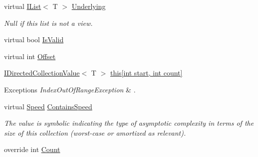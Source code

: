 \begin{DoxyCompactItemize}
\item 
virtual \hyperlink{interface_c5_1_1_i_list}{I\+List}$<$ T $>$ \hyperlink{class_c5_1_1_hashed_linked_list_ab70556e117c40bfeea64e24daa937955}{Underlying}
\begin{DoxyCompactList}\small\item\em Null if this list is not a view. \end{DoxyCompactList}\item 
virtual bool \hyperlink{class_c5_1_1_hashed_linked_list_a548a9179889fa5600ad6cea96b341893}{Is\+Valid}
\item 
virtual int \hyperlink{class_c5_1_1_hashed_linked_list_aae6da46ea57defcd779416e00622adbb}{Offset}
\item 
\hyperlink{interface_c5_1_1_i_directed_collection_value}{I\+Directed\+Collection\+Value}$<$ T $>$ \hyperlink{class_c5_1_1_hashed_linked_list_aaf5b40fcd1eaa99ad9d4a0127f286e3f}{this\mbox{[}int start, int count\mbox{]}}
\begin{DoxyCompactList}\small\item\em 
\begin{DoxyExceptions}{Exceptions}
{\em Index\+Out\+Of\+Range\+Exception} & . \\
\hline
\end{DoxyExceptions}
\end{DoxyCompactList}\item 
virtual \hyperlink{namespace_c5_a615ba88dcdaa8d5a3c5f833a73d7fad6}{Speed} \hyperlink{class_c5_1_1_hashed_linked_list_adfd49be207b1d5fe11d101a27ce194f1}{Contains\+Speed}
\begin{DoxyCompactList}\small\item\em The value is symbolic indicating the type of asymptotic complexity in terms of the size of this collection (worst-\/case or amortized as relevant). \end{DoxyCompactList}\item 
override int \hyperlink{class_c5_1_1_hashed_linked_list_a73efb105a40772ad5ca242801db6d5ff}{Count}
\item 

\end{DoxyCompactItemize}
